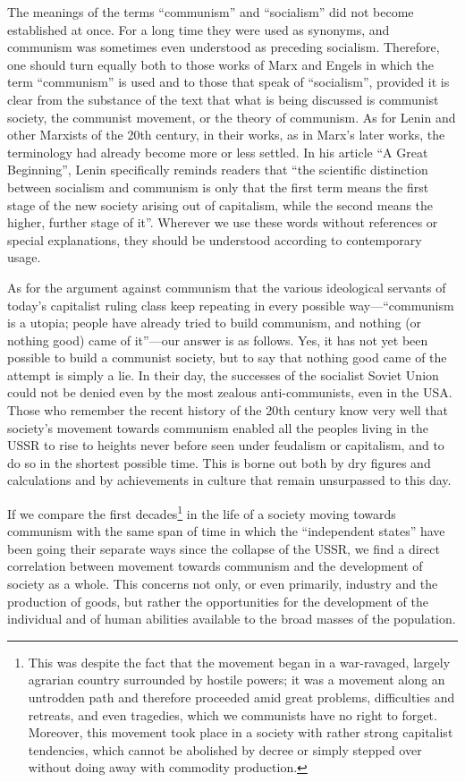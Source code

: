 \documentclass[../main]{subfiles}
\begin{document}
The meanings of the terms “communism” and “socialism” did not become established at once. For a long time they were used as synonyms, and communism was sometimes even understood as preceding socialism. Therefore, one should turn equally both to those works of Marx and Engels in which the term “communism” is used and to those that speak of “socialism”, provided it is clear from the substance of the text that what is being discussed is communist society, the communist movement, or the theory of communism. As for Lenin and other Marxists of the 20th century, in their works, as in Marx’s later works, the terminology had already become more or less settled. In his article “A Great Beginning”, Lenin specifically reminds readers that “the scientific distinction between socialism and communism is only that the first term means the first stage of the new society arising out of capitalism, while the second means the higher, further stage of it”. Wherever we use these words without references or special explanations, they should be understood according to contemporary usage.

As for the argument against communism that the various ideological servants of today’s capitalist ruling class keep repeating in every possible way—“communism is a utopia; people have already tried to build communism, and nothing (or nothing good) came of it”—our answer is as follows. Yes, it has not yet been possible to build a communist society, but to say that nothing good came of the attempt is simply a lie. In their day, the successes of the socialist Soviet Union could not be denied even by the most zealous anti-communists, even in the USA. Those who remember the recent history of the 20th century know very well that society’s movement towards communism enabled all the peoples living in the USSR to rise to heights never before seen under feudalism or capitalism, and to do so in the shortest possible time. This is borne out both by dry figures and calculations and by achievements in culture that remain unsurpassed to this day.

If we compare the first decades\footnote{This was despite the fact that the movement began in a war-ravaged, largely agrarian country surrounded by hostile powers; it was a movement along an untrodden path and therefore proceeded amid great problems, difficulties and retreats, and even tragedies, which we communists have no right to forget. Moreover, this movement took place in a society with rather strong capitalist tendencies, which cannot be abolished by decree or simply stepped over without doing away with commodity production.} in the life of a society moving towards communism with the same span of time in which the “independent states” have been going their separate ways since the collapse of the USSR, we find a direct correlation between movement towards communism and the development of society as a whole. This concerns not only, or even primarily, industry and the production of goods, but rather the opportunities for the development of the individual and of human abilities available to the broad masses of the population.
\end{document}
